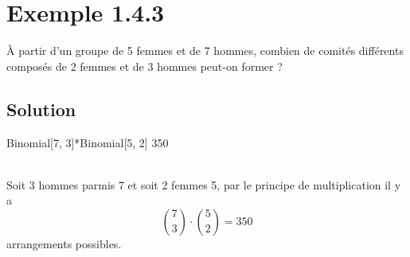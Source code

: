 \section*{Exemple 1.4.3}
	À partir d'un groupe de 5 femmes et de 7 hommes, combien de comités différents composés de 2 femmes et de 3 hommes peut-on former ?
\subsection*{Solution}
\begin{multicols}{2}
\begin{verbbox}
Binomial[7, 3]*Binomial[5, 2]
350
\end{verbbox}
	\theverbbox
	\columnbreak
	\\
	Soit 3 hommes parmis 7 et soit 2 femmes 5, par le principe de multiplication il y a 
	\begin{equation*}
		\binom{7}{3}\cdot\binom{5}{2}=350
	\end{equation*}
	arrangements possibles.
\end{multicols}